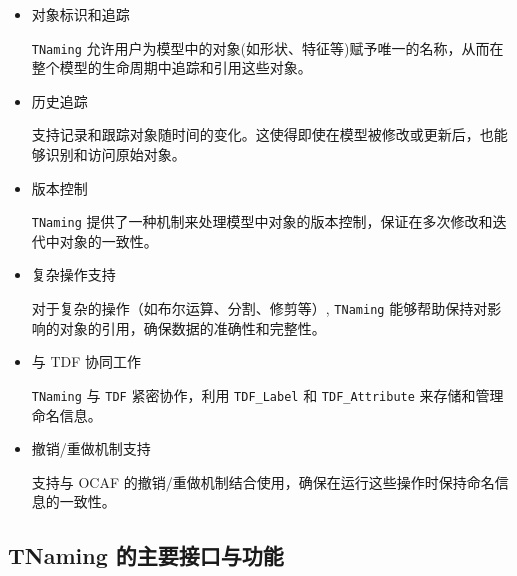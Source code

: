 \documentclass[11pt]{article}
\begin{document}
\begin{itemize}
\item 对象标识和追踪

\texttt{TNaming} 允许用户为模型中的对象(如形状、特征等)赋予唯一的名称，从而在整个模型的生命周期中追踪和引用这些对象。

\item 历史追踪

支持记录和跟踪对象随时间的变化。这使得即使在模型被修改或更新后，也能够识别和访问原始对象。

\item 版本控制

\texttt{TNaming} 提供了一种机制来处理模型中对象的版本控制，保证在多次修改和迭代中对象的一致性。

\item 复杂操作支持

对于复杂的操作（如布尔运算、分割、修剪等）, \texttt{TNaming} 能够帮助保持对影响的对象的引用，确保数据的准确性和完整性。

\item 与 TDF 协同工作

\texttt{TNaming} 与 \texttt{TDF} 紧密协作，利用 \texttt{TDF\_Label} 和 \texttt{TDF\_Attribute} 来存储和管理命名信息。

\item 撤销/重做机制支持

支持与 OCAF 的撤销/重做机制结合使用，确保在运行这些操作时保持命名信息的一致性。
\end{itemize}
\subsection{TNaming 的主要接口与功能}
\label{sec:org35cbe06}
\end{document}
